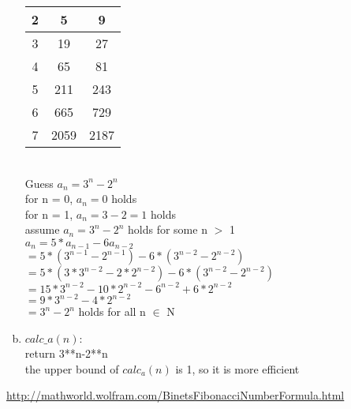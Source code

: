 \documentclass[11pt, a4paper]{article}
\begin{document}
\begin{enumerate}[(a)]
\begin{tabular}{ | c | c | c | }
        \hline
        2 & 5 & 9\\
        \hline
        3 & 19 & 27\\
        \hline
        4 & 65 & 81\\
        \hline
        5 & 211 & 243\\
        \hline
        6 & 665 & 729\\
        \hline
        7 & 2059 & 2187\\
        \hline
    \end{tabular}\\
    Guess $a_n=3^n-2^n$\\
    for n = 0, $a_n=0$ holds\\
    for n = 1, $a_n=3-2=1$ holds\\
    assume $a_n=3^n-2^n$ holds for some n $>$ 1\\
    $a_n = 5*a_{n-1} - 6a_{n-2}$\\
    $= 5*(3^{n-1}-2^{n-1}) - 6*(3^{n-2}-2^{n-2})$\\
    $= 5*(3*3^{n-2}-2*2^{n-2}) - 6*(3^{n-2}-2^{n-2})$\\
    $= 15*3^{n-2} - 10*2^{n-2} - 6^{n-2} + 6*2^{n-2}$\\
    $= 9*3^{n-2} - 4*2^{n-2}$\\
    $= 3^{n} - 2^{n}$ holds for all n $\in$ N
    \item
    $calc\_a(n):$\\
        return 3**n-2**n\\
    the upper bound of $calc_a(n)$ is 1, so it is more efficient
\end{enumerate}
\begin{thebibliography}{99}
    \url{http://mathworld.wolfram.com/BinetsFibonacciNumberFormula.html} 
\end{thebibliography}
\end{document}
